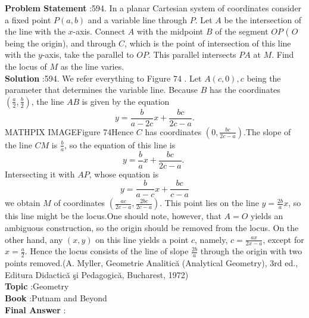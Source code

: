 \documentclass[10pt]{article}
\begin{document}
\textbf{Problem Statement} :594. In a planar Cartesian system of coordinates consider a fixed point $P(a, b)$ and a variable line through $P$. Let $A$ be the intersection of the line with the $x$-axis. Connect $A$ with the midpoint $B$ of the segment $O P$ ( $O$ being the origin), and through $C$, which is the point of intersection of this line with the $y$-axis, take the parallel to $O P$. This parallel intersects $P A$ at $M$. Find the locus of $M$ as the line varies.\\
\textbf{Solution} :594. We refer everything to Figure 74 . Let $A(c, 0), c$ being the parameter that determines the variable line. Because $B$ has the coordinates $\left(\frac{a}{2}, \frac{b}{2}\right)$, the line $A B$ is given by the equation$$ y=\frac{b}{a-2 c} x+\frac{b c}{2 c-a} . $$MATHPIX IMAGEFigure 74Hence $C$ has coordinates $\left(0, \frac{b c}{2 c-a}\right)$.The slope of the line $C M$ is $\frac{b}{a}$, so the equation of this line is$$ y=\frac{b}{a} x+\frac{b c}{2 c-a} \text {. } $$Intersecting it with $A P$, whose equation is$$ y=\frac{b}{a-c} x+\frac{b c}{c-a} $$we obtain $M$ of coordinates $\left(\frac{a c}{2 c-a}, \frac{2 b c}{2 c-a}\right)$. This point lies on the line $y=\frac{2 b}{a} x$, so this line might be the locus.One should note, however, that $A=O$ yields an ambiguous construction, so the origin should be removed from the locus. On the other hand, any $(x, y)$ on this line yields a point $c$, namely, $c=\frac{a x}{2 x-a}$, except for $x=\frac{a}{2}$. Hence the locus consists of the line of slope $\frac{2 b}{a}$ through the origin with two points removed.(A. Myller, Geometrie Analitică (Analytical Geometry), 3rd ed., Editura Didactică şi Pedagogică, Bucharest, 1972)\\
\textbf{Topic} :Geometry\\
\textbf{Book} :Putnam and Beyond\\
\textbf{Final Answer} :\\
\end{document}
